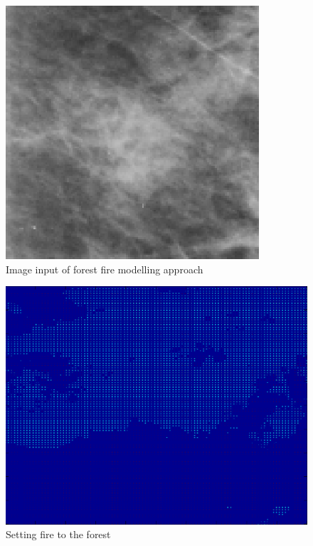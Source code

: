 \documentclass[review,12pt]{elsarticle}
\begin{document}
\begin{figure}
\center
\includegraphics[scale=1.75]{images/input_fire_NEW.eps}
\caption{Image input of forest fire modelling approach}
\label{fig:inputfire}
\end{figure}

\begin{figure}
\center
\includegraphics[scale=0.5]{images/seting_fire_NEW.eps}
\caption{Setting fire to the forest}
\label{fig:thresholdingfire}
\end{figure}
\end{document}
